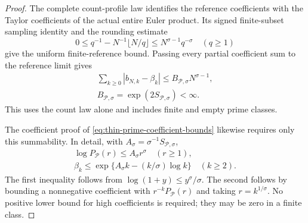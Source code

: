 \documentclass[11pt]{article}
\theoremstyle{definition}
\begin{document}
\begin{proof}
The complete count-profile law identifies the reference coefficients
with the Taylor coefficients of the actual entire Euler product.
Its signed finite-subset sampling identity and the rounding estimate
\[
 0\le q^{-1}-N^{-1}\lfloor N/q\rfloor
                 \le N^{\sigma-1}q^{-\sigma}\quad(q\ge1)
\]
give the uniform finite-reference bound. Passing every partial
coefficient sum to the reference limit gives
\begin{equation}
 \begin{gathered}
 \sum_{k\ge0}|b_{N,k}-\beta_k|
     \le B_{\mathcal P,\sigma}N^{\sigma-1},\\
 B_{\mathcal P,\sigma}
       =\exp(2S_{\mathcal P,\sigma})<\infty .
 \end{gathered}
 \label{eq:finite-decoding-arithmetic-input}
\end{equation}
This uses the count law alone and includes finite and empty prime classes.

The coefficient proof of
\eqref{eq:thin-prime-coefficient-bounds} likewise requires only
this summability. In detail, with
$A_\sigma=\sigma^{-1}S_{\mathcal P,\sigma}$,
\[
 \begin{gathered}
 \log P_{\mathcal P}(r)\le A_\sigma r^\sigma\quad(r\ge1),\\
 \beta_k\le\exp\{A_\sigma k-(k/\sigma)\log k\}\quad(k\ge2).
 \end{gathered}
\]
The first inequality follows from
$\log(1+y)\le y^\sigma/\sigma$.
The second follows by bounding a nonnegative coefficient with
$r^{-k}P_{\mathcal P}(r)$ and taking $r=k^{1/\sigma}$.
No positive lower bound for high coefficients is required;
they may be zero in a finite class.


\end{proof}
\end{document}
